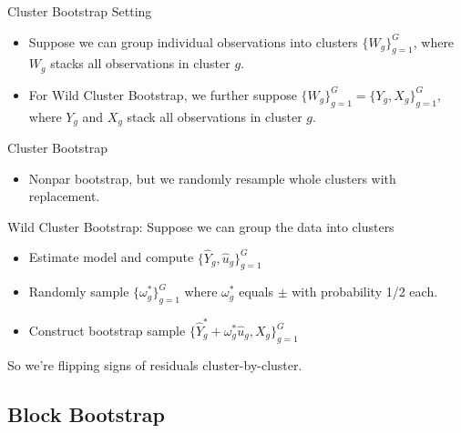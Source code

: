 \documentclass[aspectratio=169, handout]{beamer}
\begin{document}
{\footnotesize
\begin{frame}{Cluster Bootstrap}
Setting
\begin{itemize}
  \item Suppose we can group individual observations into clusters
    $\{W_g\}_{g=1}^G$, where $W_g$ stacks all observations in cluster
    $g$.
  \item For Wild Cluster Bootstrap, we further suppose
    $\{W_g\}_{g=1}^G=\{Y_g,X_g\}_{g=1}^G$, where $Y_g$ and $X_g$ stack
    all observations in cluster $g$.
\end{itemize}
\alert{Cluster Bootstrap}
\begin{itemize}
  \item Nonpar bootstrap, but we randomly resample
    \alert{whole clusters} with replacement.
\end{itemize}
\alert{Wild Cluster Bootstrap}:
Suppose we can group the data into clusters
\begin{itemize}
  \item Estimate model and compute $\{\hat{Y}_g,\hat{u}_g\}_{g=1}^G$
  \item Randomly sample $\{\omega_g^*\}_{g=1}^G$ where
    $\omega_g^*$ equals $\pm$ with probability 1/2 each.
  \item Construct bootstrap sample
    $\{\hat{Y}_g^*+\omega_g^*\hat{u}_g,X_g\}_{g=1}^G$
\end{itemize}
So we're flipping signs of residuals cluster-by-cluster.
\end{frame}
}



\subsection{Block Bootstrap}
\end{document}
